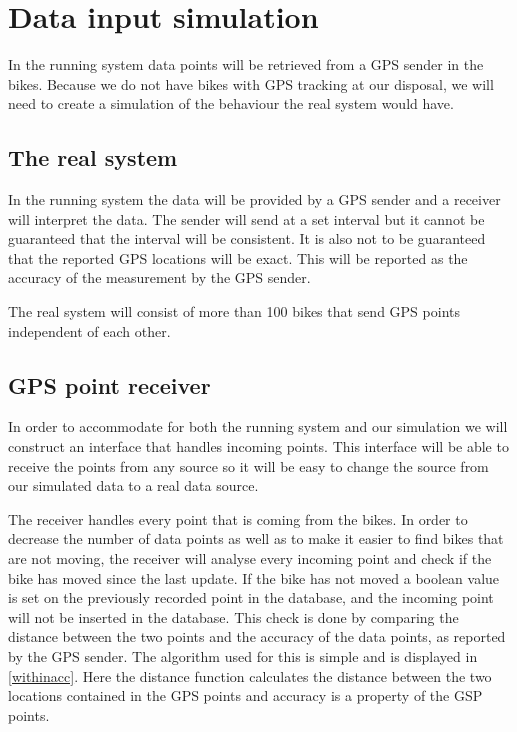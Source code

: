 \section{Data input simulation}\label{design:datasimulation}

In the running system data points will be retrieved from a GPS sender in the bikes.
Because we do not have bikes with GPS tracking at our disposal, we will need to create a simulation of the behaviour the real system would have.

\subsection{The real system}
In the running system the data will be provided by a GPS sender and a receiver will interpret the data.
The sender will send at a set interval but it cannot be guaranteed that the interval will be consistent. 
It is also not to be guaranteed that the reported GPS locations will be exact.
This will be reported as the accuracy of the measurement by the GPS sender.

The real system will consist of more than 100 bikes that send GPS points independent of each other.

\subsection{GPS point receiver}\label{design:datareceiver}
In order to accommodate for both the running system and our simulation we will construct an interface that handles incoming points.
This interface will be able to receive the points from any source so it will be easy to change the source from our simulated data to a real data source.

The receiver handles every point that is coming from the bikes.
In order to decrease the number of data points as well as to make it easier to find bikes that are not moving, the receiver will analyse every incoming point and check if the bike has moved since the last update.
If the bike has not moved a boolean value is set on the previously recorded point in the database, and the incoming point will not be inserted in the database.
This check is done by comparing the distance between the two points and the accuracy of the data points, as reported by the GPS sender.
The algorithm used for this is simple and is displayed in \cref{withinacc}.
Here the distance function calculates the distance between the two locations contained in the GPS points and accuracy is a property of the GSP points.

